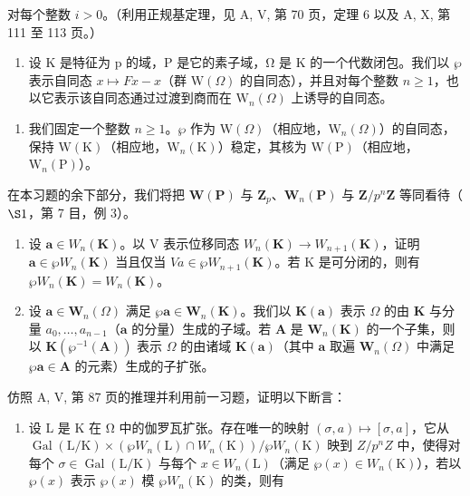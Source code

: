 对每个整数 \(i > 0\)。（利用正规基定理，见 A, V, 第 70 页，定理 6 以及 A, X, 第 111 至 113 页。）

\begin{enumerate}
\def\labelenumi{\arabic{enumi})}
\setcounter{enumi}{18}
\tightlist
\item
  设 K 是特征为 p 的域，P 是它的素子域，Ω 是 K 的一个代数闭包。我们以 \(\wp\) 表示自同态 \(x \mapsto Fx - x\)（群 \(\mathrm{W}(\Omega)\) 的自同态），并且对每个整数 \(n \geqslant 1\)，也以它表示该自同态通过过渡到商而在 \(\mathrm{W}_{n}(\Omega)\) 上诱导的自同态。
\end{enumerate}

\begin{enumerate}
\def\labelenumi{\alph{enumi})}
\tightlist
\item
  我们固定一个整数 \(n \geqslant 1\)。\(\wp\) 作为 \(\mathrm{W}(\Omega)\)（相应地，\(\mathrm{W}_{n}(\Omega)\)）的自同态，保持 \(\mathrm{W}(\mathrm{K})\)（相应地，\(\mathrm{W}_{n}(\mathrm{K})\)）稳定，其核为 \(\mathrm{W}(\mathrm{P})\)（相应地，\(\mathrm{W}_{n}(\mathrm{P})\)）。
\end{enumerate}

在本习题的余下部分，我们将把 \(\mathbf{W}(\mathbf{P})\) 与 \(\mathbf{Z}_p\)、\(\mathbf{W}_n(\mathbf{P})\) 与 \(\mathbf{Z}/p^n\mathbf{Z}\) 等同看待（\(\S 1\)，第 7 目，例 3）。

\begin{enumerate}
\def\labelenumi{\alph{enumi})}
\setcounter{enumi}{1}
\item
  设 \(\boldsymbol{a} \in W_n(\mathbf{K})\)。以 V 表示位移同态 \(W_n(\mathbf{K}) \to W_{n+1}(\mathbf{K})\)，证明 \(\boldsymbol{a} \in \wp W_n(\mathbf{K})\) 当且仅当 \(Va \in \wp W_{n+1}(\mathbf{K})\)。若 K 是可分闭的，则有 \(\wp W_n(\mathbf{K}) = W_n(\mathbf{K})\)。
\item
  设 \(\pmb{a} \in \mathbf{W}_n(\Omega)\) 满足 \(\wp \pmb{a} \in \mathbf{W}_n(\mathbf{K})\)。我们以 \(\mathbf{K}(\pmb{a})\) 表示 \(\Omega\) 的由 \(\mathbf{K}\) 与分量 \(a_0, \ldots, a_{n-1}\)（\(\pmb{a}\) 的分量）生成的子域。若 \(\mathbf{A}\) 是 \(\mathbf{W}_n(\mathbf{K})\) 的一个子集，则以 \(\mathbf{K}(\wp^{-1}(\mathbf{A}))\) 表示 \(\Omega\) 的由诸域 \(\mathbf{K}(\pmb{a})\)（其中 \(\pmb{a}\) 取遍 \(\mathbf{W}_n(\Omega)\) 中满足 \(\wp \pmb{a} \in \mathbf{A}\) 的元素）生成的子扩张。
\end{enumerate}

仿照 A, V, 第 87 页的推理并利用前一习题，证明以下断言：

\begin{enumerate}
\def\labelenumi{(\roman{enumi})}
\tightlist
\item
  设 L 是 K 在 Ω 中的伽罗瓦扩张。存在唯一的映射 \((\sigma, a) \mapsto [\sigma, a]\)，它从 \(\operatorname{Gal}(\mathrm{L}/\mathrm{K}) \times (\wp W_{n}(\mathrm{L}) \cap W_{n}(\mathrm{K}))/\wp W_{n}(\mathrm{K})\) 映到 \(Z/p^{n}Z\) 中，使得对每个 \(\sigma \in \operatorname{Gal}(\mathrm{L}/\mathrm{K})\) 与每个 \(x \in W_{n}(\mathrm{L})\)（满足 \(\wp(x) \in W_{n}(\mathrm{K})\)），若以 \(\wp(x)\) 表示 \(\wp(x)\) 模 \(\wp W_{n}(\mathrm{K})\) 的类，则有
\end{enumerate}

